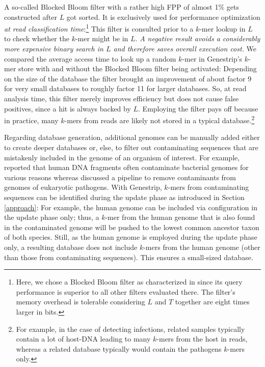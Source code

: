 \documentclass[pdflatex,sn-vancouver-num]{sn-jnl}
\begin{document}
    A so-called Blocked Bloom filter \citep{10.1145/3376122} with a rather high FPP of almost 1\% gets constructed after $L$ got sorted. It is exclusively used for performance optimization \emph{at read classification time}:\footnote{Here, we chose a Blocked Bloom filter as characterized in \cite{10.1145/3376122} since its query performance is superior to all other filters evaluated there. The filter's memory overhead is tolerable considering $L$ and $T$ together are eight times larger in bits.} This filter is consulted prior to a $k$-mer lookup in $L$ to check whether the $k$-mer might be in $L$. \emph{A negative result avoids a considerably more expensive binary search in $L$ and therefore saves overall execution cost.} We compared the average access time to look up a random $k$-mer in Genestrip's $k$-mer store with and without the Blocked Bloom filter being activated: Depending on the size of the database the filter brought an improvement of about factor 9 for very small databases to roughly factor 11 for larger databases. So, at read analysis time, this filter merely improves efficiency but does not cause false positives, since a hit is always backed by $L$. Employing the filter pays off because in practice, many $k$-mers from reads are likely not stored in a typical database.\footnote{For example, in the case of detecting infections, related samples typically contain a lot of host-DNA leading to many $k$-mers from the host in reads, whereas a related database typically would contain the pathogens $k$-mers only.}
    
    Regarding database generation, additional genomes can be manually added either to create deeper databases or, else, to filter out contaminating sequences that are mistakenly included in the genome of an organism of interest. For example, \cite{Breitwieser:2019aa} reported that human DNA fragments often  contaminate bacterial genomes for various reasons whereas \cite{Lu:2018aa} discussed a pipeline to remove contaminants from genomes of eukaryotic pathogens.
With Genestrip, $k$-mers from contaminating sequences can be identified during the update phase as introduced in Section \ref{approach}: For example, the human genome can be included via configuration in the update phase only; thus, a $k$-mer from the human genome that is also found in the contaminated genome will be pushed to the lowest common ancestor taxon of both species. Still, as the human genome is employed during the update phase only, a resulting database does not include $k$-mers from the human genome (other than those from contaminating sequences). This ensures a small-sized database.
\end{document}
